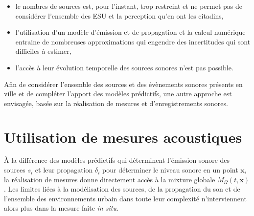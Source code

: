 \begin{itemize}
\item le nombres de sources est, pour l'instant, trop restreint et ne permet pas de considérer l'ensemble des ESU et la perception qu'en ont les citadins,
\item l'utilisation d'un modèle d'émission et de propagation et la calcul numérique entraine de nombreuses approximations qui engendre des incertitudes qui sont difficiles à estimer, 
\item l'accès à leur évolution temporelle des sources sonores n'est pas possible.
\end{itemize}

Afin de considérer l'ensemble des sources et des évènements sonores présents en ville et de compléter l'apport des modèles prédictifs, une autre approche est envisagée, basée sur la réalisation de mesures et d'enregistrements sonores.

\section{Utilisation de mesures acoustiques}

À la différence des modèles prédictifs qui déterminent l'émission sonore des sources $s_i$ et leur propagation $\delta_i$ pour déterminer le niveau sonore en un point $\mathbf{x}$, la réalisation de mesures donne directement accès à la mixture globale $M_{\Omega}(t,\mathbf{x})$. Les limites liées à la modélisation des sources, de la propagation du son et de l'ensemble des environnements urbain dans toute leur complexité n'interviennent alors plus dans la mesure faite \textit{in situ}.

